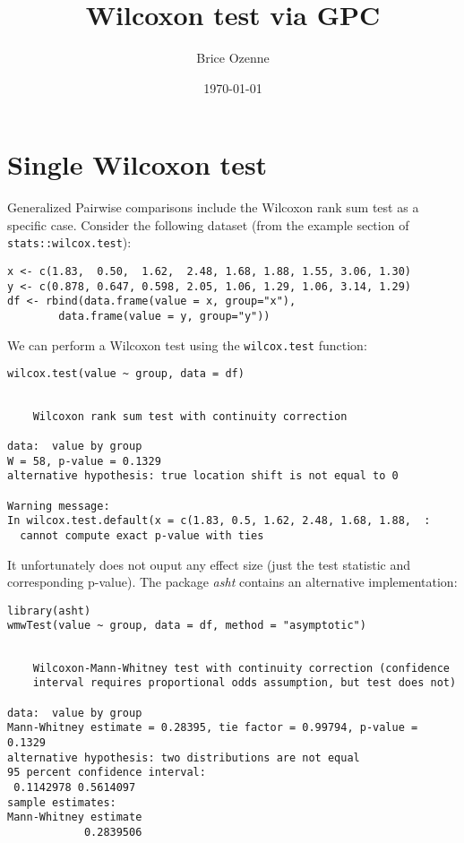 \documentclass[12pt]{article}
\author{Brice Ozenne}
\date{\today}
\title{Wilcoxon test via GPC}
\begin{document}
\maketitle

\section{Single Wilcoxon test}
\label{sec:org5e0407a}

Generalized Pairwise comparisons include the Wilcoxon rank sum test as
a specific case. \newline Consider the following dataset (from the example
section of \texttt{stats::wilcox.test}):
\lstset{language=r,label= ,caption= ,captionpos=b,numbers=none}
\begin{lstlisting}
x <- c(1.83,  0.50,  1.62,  2.48, 1.68, 1.88, 1.55, 3.06, 1.30)
y <- c(0.878, 0.647, 0.598, 2.05, 1.06, 1.29, 1.06, 3.14, 1.29)
df <- rbind(data.frame(value = x, group="x"),
	    data.frame(value = y, group="y"))
\end{lstlisting}

We can perform a Wilcoxon test using the \texttt{wilcox.test} function:
\lstset{language=r,label= ,caption= ,captionpos=b,numbers=none}
\begin{lstlisting}
wilcox.test(value ~ group, data = df)
\end{lstlisting}

\begin{verbatim}

	Wilcoxon rank sum test with continuity correction

data:  value by group
W = 58, p-value = 0.1329
alternative hypothesis: true location shift is not equal to 0

Warning message:
In wilcox.test.default(x = c(1.83, 0.5, 1.62, 2.48, 1.68, 1.88,  :
  cannot compute exact p-value with ties
\end{verbatim}

It unfortunately does not ouput any effect size (just the test
statistic and corresponding p-value). The package \emph{asht} contains an
alternative implementation:
\lstset{language=r,label= ,caption= ,captionpos=b,numbers=none}
\begin{lstlisting}
library(asht)
wmwTest(value ~ group, data = df, method = "asymptotic")
\end{lstlisting}

\begin{verbatim}

	Wilcoxon-Mann-Whitney test with continuity correction (confidence
	interval requires proportional odds assumption, but test does not)

data:  value by group
Mann-Whitney estimate = 0.28395, tie factor = 0.99794, p-value = 0.1329
alternative hypothesis: two distributions are not equal
95 percent confidence interval:
 0.1142978 0.5614097
sample estimates:
Mann-Whitney estimate 
            0.2839506
\end{verbatim}
\end{document}
